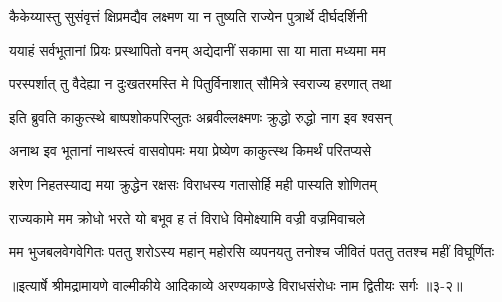 \twolineshloka
{कैकेय्यास्तु सुसंवृत्तं क्षिप्रमद्यैव लक्ष्मण}
{या न तुष्यति राज्येन पुत्रार्थे दीर्घदर्शिनी} %

\twolineshloka
{ययाहं सर्वभूतानां प्रियः प्रस्थापितो वनम्}
{अद्येदानीं सकामा सा या माता मध्यमा मम} %

\twolineshloka
{परस्पर्शात् तु वैदेह्या न दुःखतरमस्ति मे}
{पितुर्विनाशात् सौमित्रे स्वराज्य हरणात् तथा} %

\twolineshloka
{इति ब्रुवति काकुत्स्थे बाष्पशोकपरिप्लुतः}
{अब्रवील्लक्ष्मणः क्रुद्धो रुद्धो नाग इव श्वसन्} %

\twolineshloka
{अनाथ इव भूतानां नाथस्त्वं वासवोपमः}
{मया प्रेष्येण काकुत्स्थ किमर्थं परितप्यसे} %

\twolineshloka
{शरेण निहतस्याद्य मया क्रुद्धेन रक्षसः}
{विराधस्य गतासोर्हि मही पास्यति शोणितम्} %

\twolineshloka
{राज्यकामे मम क्रोधो भरते यो बभूव ह}
{तं विराधे विमोक्ष्यामि वज्री वज्रमिवाचले} %

\twolineshloka
{मम भुजबलवेगवेगितः पततु शरोऽस्य महान् महोरसि}
{व्यपनयतु तनोश्च जीवितं पततु ततश्च महीं विघूर्णितः} %


॥इत्यार्षे श्रीमद्रामायणे वाल्मीकीये आदिकाव्ये अरण्यकाण्डे विराधसंरोधः नाम द्वितीयः सर्गः ॥३-२॥
